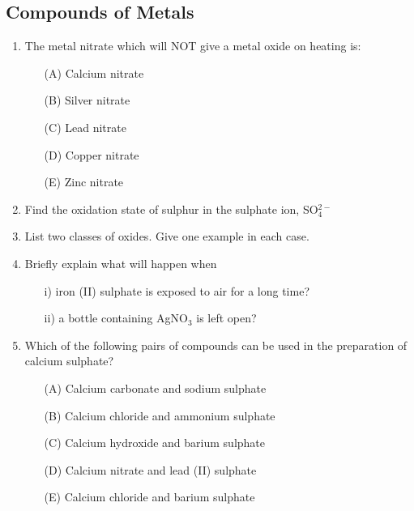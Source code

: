 \subsection{Compounds of Metals}

\begin{enumerate}
	\item The metal nitrate which will NOT give a metal oxide on heating is:
	\begin{enumerate}[topsep=0ex,itemsep=0ex,partopsep=1ex,parsep=1ex]
		\item[(A)] Calcium nitrate
		\item[(B)] Silver nitrate
		\item[(C)] Lead nitrate
		\item[(D)] Copper nitrate
		\item[(E)] Zinc nitrate
	\end{enumerate}

	\item Find the oxidation state of sulphur in the sulphate ion, SO$_4^{2-}$
	
	\item List two classes of oxides. Give one example in each case.
	
	\item Briefly explain what will happen when
	\begin{enumerate}[topsep=0ex,itemsep=0ex,partopsep=1ex,parsep=1ex]
		\item[i)] iron (II) sulphate is exposed to air for a long time?
		\item[ii)] a bottle containing AgNO$_3$ is left open?
	\end{enumerate}
	
	\item Which of the following pairs of compounds can be used in the preparation of calcium sulphate?
	\begin{enumerate}[topsep=0ex,itemsep=0ex,partopsep=1ex,parsep=1ex]
		\item[(A)] Calcium carbonate and sodium sulphate
		\item[(B)] Calcium chloride and ammonium sulphate
		\item[(C)] Calcium hydroxide and barium sulphate
		\item[(D)] Calcium nitrate and lead (II) sulphate
		\item[(E)] Calcium chloride and barium sulphate
	\end{enumerate}

\end{enumerate}






